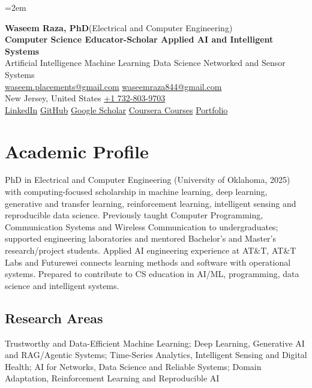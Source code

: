 \documentclass[9pt,letterpaper]{extarticle}
\begin{document}
\emergencystretch=2em
\begin{center}
{\LARGE\bfseries Waseem Raza, PhD}{\normalsize\mdseries \enspace (Electrical and Computer Engineering)}\\[2pt]
{\large\bfseries Computer Science Educator-Scholar \textbar{} Applied AI and Intelligent Systems}\\[1pt]
{\small Artificial Intelligence \textbar{} Machine Learning \textbar{} Data Science \textbar{} Networked and Sensor Systems}\\[3pt]
{\footnotesize {}\enspace \href{mailto:waseem.placements@gmail.com}{waseem.placements@gmail.com} \textbar{} \href{mailto:waseemraza844@gmail.com}{waseemraza844@gmail.com}\\[1pt]New Jersey, United States \quad {}\enspace \href{tel:+17328039703}{+1 732-803-9703}\\[1pt]\href{https://www.linkedin.com/in/waseem-raza-phd-9a737858/}{LinkedIn} \textbar{} \href{https://github.com/WaseemRaza844}{GitHub} \textbar{} \href{https://scholar.google.com/citations?user=d58Drr0AAAAJ\&hl=en}{Google Scholar} \textbar{} \href{https://waseemraza844.github.io/portfolio/learning.html}{Coursera Courses} \textbar{} \href{https://waseemraza844.github.io/portfolio/}{Portfolio}}
\end{center}
\vspace{-5pt}
\section{Academic Profile}
PhD in Electrical and Computer Engineering (University of Oklahoma, 2025) with computing-focused scholarship in machine learning, deep learning, generative and transfer learning, reinforcement learning, intelligent sensing and reproducible data science. Previously taught Computer Programming, Communication Systems and Wireless Communication to undergraduates; supported engineering laboratories and mentored Bachelor's and Master's research/project students. Applied AI engineering experience at AT\&T, AT\&T Labs and Futurewei connects learning methods and software with operational systems. Prepared to contribute to CS education in AI/ML, programming, data science and intelligent systems.
\subsection{Research Areas}
Trustworthy and Data-Efficient Machine Learning; Deep Learning, Generative AI and RAG/Agentic Systems; Time-Series Analytics, Intelligent Sensing and Digital Health; AI for Networks, Data Science and Reliable Systems; Domain Adaptation, Reinforcement Learning and Reproducible AI\par
{}
\end{document}
